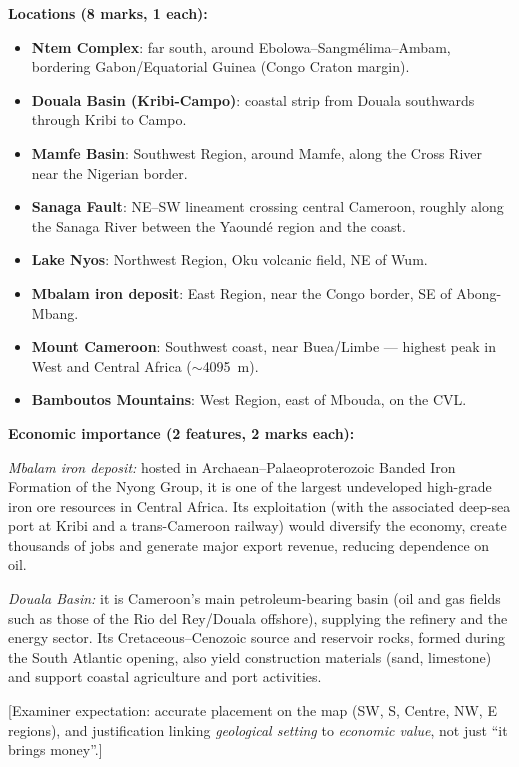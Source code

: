 \documentclass[11pt]{article}
\begin{document}
\begin{corrige}
\textbf{Locations (8 marks, 1 each):}
\begin{itemize}
\item \textbf{Ntem Complex}: far south, around Ebolowa–Sangmélima–Ambam, bordering Gabon/Equatorial Guinea (Congo Craton margin).
\item \textbf{Douala Basin (Kribi-Campo)}: coastal strip from Douala southwards through Kribi to Campo.
\item \textbf{Mamfe Basin}: Southwest Region, around Mamfe, along the Cross River near the Nigerian border.
\item \textbf{Sanaga Fault}: NE–SW lineament crossing central Cameroon, roughly along the Sanaga River between the Yaoundé region and the coast.
\item \textbf{Lake Nyos}: Northwest Region, Oku volcanic field, NE of Wum.
\item \textbf{Mbalam iron deposit}: East Region, near the Congo border, SE of Abong-Mbang.
\item \textbf{Mount Cameroon}: Southwest coast, near Buea/Limbe — highest peak in West and Central Africa ($\sim$\SI{4095}{m}).
\item \textbf{Bamboutos Mountains}: West Region, east of Mbouda, on the CVL.
\end{itemize}

\textbf{Economic importance (2 features, 2 marks each):}

\emph{Mbalam iron deposit:} hosted in Archaean–Palaeoproterozoic Banded Iron Formation of the Nyong Group, it is one of the largest undeveloped high-grade iron ore resources in Central Africa. Its exploitation (with the associated deep-sea port at Kribi and a trans-Cameroon railway) would diversify the economy, create thousands of jobs and generate major export revenue, reducing dependence on oil.

\emph{Douala Basin:} it is Cameroon's main petroleum-bearing basin (oil and gas fields such as those of the Rio del Rey/Douala offshore), supplying the refinery and the energy sector. Its Cretaceous–Cenozoic source and reservoir rocks, formed during the South Atlantic opening, also yield construction materials (sand, limestone) and support coastal agriculture and port activities.

[Examiner expectation: accurate placement on the map (SW, S, Centre, NW, E regions), and justification linking \emph{geological setting} to \emph{economic value}, not just ``it brings money''.]
\end{corrige}
\end{document}
